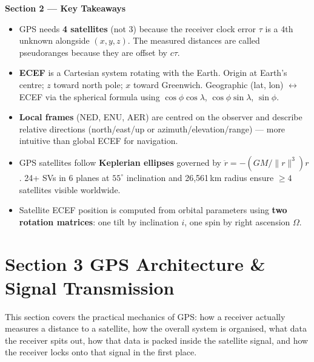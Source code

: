 \documentclass[12pt, a4paper]{article}
\begin{document}
\begin{keybox}
  \textbf{Section 2 --- Key Takeaways}
  \begin{itemize}[leftmargin=1.2em,itemsep=2pt]
    \item GPS needs \textbf{4 satellites} (not 3) because the receiver
      clock error $\tau$ is a 4th unknown alongside $(x, y, z)$.
      The measured distances are called pseudoranges because they are
      offset by $c\tau$.
    \item \textbf{ECEF} is a Cartesian system rotating with the Earth.
      Origin at Earth's centre; $z$ toward north pole; $x$ toward
      Greenwich.
      Geographic (lat, lon) $\leftrightarrow$ ECEF via the spherical
      formula using $\cos\phi\cos\lambda$, $\cos\phi\sin\lambda$,
      $\sin\phi$.
    \item \textbf{Local frames} (NED, ENU, AER) are centred on the
      observer and describe relative directions (north/east/up or
      azimuth/elevation/range) --- more intuitive than global ECEF
      for navigation.
    \item GPS satellites follow \textbf{Keplerian ellipses} governed
      by $\ddot{r} = -(GM/\|r\|^3)r$.
      24+ SVs in 6 planes at $55^\circ$ inclination and 26,561\,km
      radius ensure $\geq 4$ satellites visible worldwide.
    \item Satellite ECEF position is computed from orbital parameters
      using \textbf{two rotation matrices}: one tilt by inclination
      $i$, one spin by right ascension $\Omega$.
  \end{itemize}
\end{keybox}

\clearpage
\section*{Section 3 \quad GPS Architecture \& Signal Transmission}

This section covers the practical mechanics of GPS: how a receiver actually
measures a distance to a satellite, how the overall system is organised, what
data the receiver spits out, how that data is packed inside the satellite
signal, and how the receiver locks onto that signal in the first place.

\end{document}

